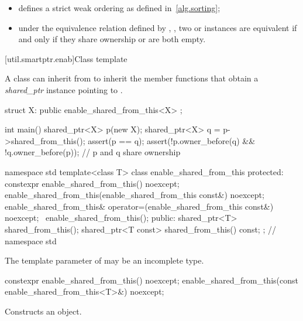 \begin{itemize}
\item {} defines a strict weak ordering as defined in~\ref{alg.sorting};

\item under the equivalence relation defined by ,
, two  or
 instances are equivalent if and only if they share ownership or are
both empty.
\end{itemize} \exitnote

[util.smartptr.enab]{Class template }

\pnum
{}%
A class  can inherit from 
to inherit the  member functions that obtain
a \textit{shared_ptr} instance pointing to .

\pnum
\enterexample

\begin{codeblock}
struct X: public enable_shared_from_this<X> {
};

int main() {
  shared_ptr<X> p(new X);
  shared_ptr<X> q = p->shared_from_this();
  assert(p == q);
  assert(!p.owner_before(q) && !q.owner_before(p)); // p and q share ownership
}
\end{codeblock}
\exitexample

\begin{codeblock}
namespace std {
  template<class T> class enable_shared_from_this {
  protected:
    constexpr enable_shared_from_this() noexcept;
    enable_shared_from_this(enable_shared_from_this const&) noexcept;
    enable_shared_from_this& operator=(enable_shared_from_this const&) noexcept;
    ~enable_shared_from_this();
  public:
    shared_ptr<T> shared_from_this();
    shared_ptr<T const> shared_from_this() const;
  };
} // namespace std
\end{codeblock}

\pnum
The template parameter  of 
may be an incomplete type.

%
\begin{itemdecl}
constexpr enable_shared_from_this() noexcept;
enable_shared_from_this(const enable_shared_from_this<T>&) noexcept;
\end{itemdecl}

\begin{itemdescr}
\pnum\effects  Constructs an  object.
\end{itemdescr}

